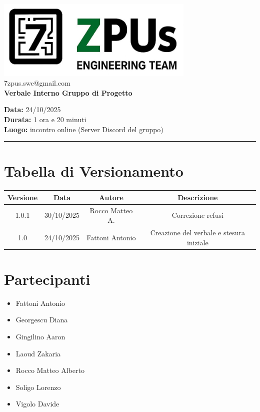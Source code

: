 \documentclass[a4paper,12pt]{article}
\begin{document}
\begin{center}
    \includegraphics[width=9.5cm]{../../../assets/logo7zpus.jpg}\\
    \small\hspace{10cm} 7zpus.swe@gmail.com\\
    \Large \textbf{Verbale Interno Gruppo di Progetto}\\
    \vspace{0.5cm}
\end{center}

\noindent
\textbf{Data:} 24/10/2025 \\
\textbf{Durata:} 1 ora e 20 minuti \\
\textbf{Luogo:} incontro online (Server Discord del gruppo)

\vspace{0.3cm}
\hrule
\vspace{0.5cm}

\tableofcontents

\newpage

\section*{Tabella di Versionamento}
    \begin{tabular}{|c|c|c|c|}
        \hline
        \textbf{Versione} & \textbf{Data} & \textbf{Autore} & \textbf{Descrizione} \\
        \hline
        1.0.1 & 30/10/2025 & Rocco Matteo A. & Correzione refusi \\
        \hline
        1.0 & 24/10/2025 & Fattoni Antonio & Creazione del verbale e stesura iniziale \\
        \hline
    \end{tabular}


\section*{Partecipanti}
\begin{itemize}[noitemsep]
    \item Fattoni Antonio 
    \item Georgescu Diana
    \item Gingilino Aaron
    \item Laoud Zakaria
    \item Rocco Matteo Alberto
    \item Soligo Lorenzo
    \item Vigolo Davide
\end{itemize}
\end{document}
